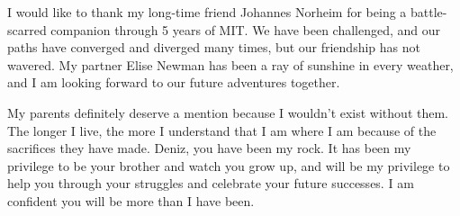 I would like to thank my long-time friend Johannes Norheim
for being a battle-scarred companion through 5 years of MIT. We have been challenged, and
our paths have converged and diverged many times, but our friendship has not wavered.
My partner Elise Newman has been a ray of sunshine in every weather,
and I am looking forward to our future adventures together.

My parents definitely deserve a mention because I wouldn't exist without them.
The longer I live, the more I understand that I am where I am because of the
sacrifices they have made.
Deniz, you have been my rock. It has been my privilege to be your brother and watch
you grow up, and will be my privilege to help you
through your struggles and celebrate your future successes.
I am confident you will be more than I have been.

